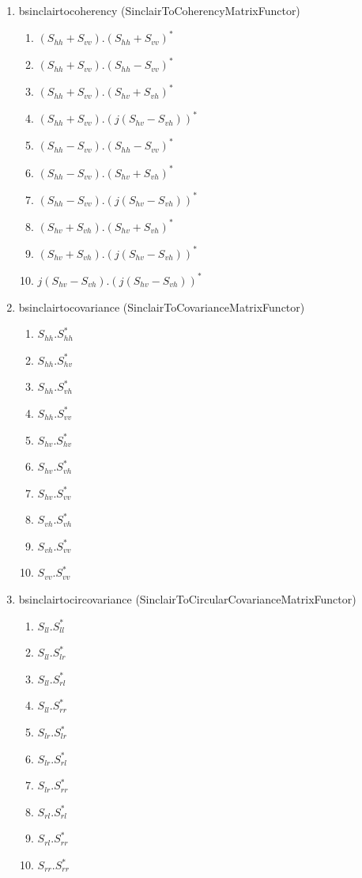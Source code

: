 \begin{enumerate}
\renewcommand{\labelenumii}{Channel \arabic{enumii} : }
\setcounter{enumi}{8}

\item bsinclairtocoherency (SinclairToCoherencyMatrixFunctor)
\begin{enumerate}
\item $ (S_{hh}+S_{vv}).(S_{hh}+S_{vv})^{*} $ 
\item $ (S_{hh}+S_{vv}).(S_{hh}-S_{vv})^{*} $ 
\item $ (S_{hh}+S_{vv}).(S_{hv}+S_{vh})^{*} $ 
\item $ (S_{hh}+S_{vv}).( j (S_{hv}-S_{vh}))^{*} $ 
\item $ (S_{hh}-S_{vv}).(S_{hh}-S_{vv})^{*} $ 
\item $ (S_{hh}-S_{vv}).(S_{hv}+S_{vh})^{*} $ 
\item $ (S_{hh}-S_{vv}).( j (S_{hv}-S_{vh}))^{*} $ 
\item $ (S_{hv}+S_{vh}).(S_{hv}+S_{vh})^{*} $ 
\item $ (S_{hv}+S_{vh}).( j (S_{hv}-S_{vh}))^{*} $ 
\item $ j (S_{hv}-S_{vh}).( j (S_{hv}-S_{vh}))^{*} $
\end{enumerate}
 
\item bsinclairtocovariance (SinclairToCovarianceMatrixFunctor)
\begin{enumerate}
\item $ S_{hh}.S_{hh}^{*} $ 
\item $ S_{hh}.S_{hv}^{*} $ 
\item $ S_{hh}.S_{vh}^{*} $ 
\item $ S_{hh}.S_{vv}^{*} $ 
\item $ S_{hv}.S_{hv}^{*} $ 
\item $ S_{hv}.S_{vh}^{*} $ 
\item $ S_{hv}.S_{vv}^{*} $ 
\item $ S_{vh}.S_{vh}^{*} $ 
\item $ S_{vh}.S_{vv}^{*} $ 
\item $ S_{vv}.S_{vv}^{*} $
\end{enumerate}
 
\item bsinclairtocircovariance (SinclairToCircularCovarianceMatrixFunctor)
\begin{enumerate}
\item $ S_{ll}.S_{ll}^{*} $ 
\item $ S_{ll}.S_{lr}^{*} $ 
\item $ S_{ll}.S_{rl}^{*} $ 
\item $ S_{ll}.S_{rr}^{*} $ 
\item $ S_{lr}.S_{lr}^{*} $ 
\item $ S_{lr}.S_{rl}^{*} $ 
\item $ S_{lr}.S_{rr}^{*} $ 
\item $ S_{rl}.S_{rl}^{*} $ 
\item $ S_{rl}.S_{rr}^{*} $ 
\item $ S_{rr}.S_{rr}^{*} $ 
\end{enumerate}


\end{enumerate}
